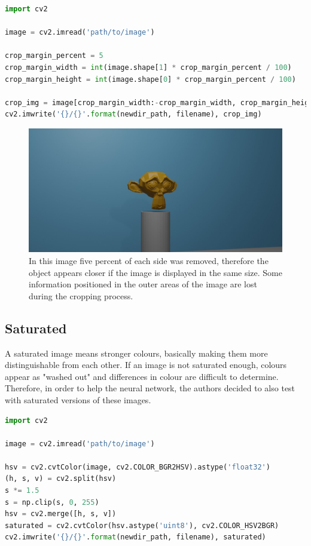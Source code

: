 \begin{lstlisting}[language=python]
import cv2

image = cv2.imread('path/to/image')

crop_margin_percent = 5
crop_margin_width = int(image.shape[1] * crop_margin_percent / 100)
crop_margin_height = int(image.shape[0] * crop_margin_percent / 100)

crop_img = image[crop_margin_width:-crop_margin_width, crop_margin_height:-crop_margin_height]
cv2.imwrite('{}/{}'.format(newdir_path, filename), crop_img)
\end{lstlisting}

\begin{figure}[h!]
	\centering
	\includegraphics[width=4.5in]{img/implementation_opencv_cropping.jpg}
	\caption{In this image five percent of each side was removed, therefore the object appears closer if the image is displayed in the same size. Some information positioned in the outer areas of the image are lost during the cropping process.}
	\label{pic:implementation_opencv_cropping}
\end{figure}

\subsection{Saturated}
A saturated image means stronger colours, basically making them more distinguishable from each other. If an image is not saturated enough, colours appear as "washed out" and differences in colour are difficult to determine. Therefore, in order to help the neural network, the authors decided to also test with saturated versions of these images.

\begin{lstlisting}[language=python]
import cv2

image = cv2.imread('path/to/image')

hsv = cv2.cvtColor(image, cv2.COLOR_BGR2HSV).astype('float32')
(h, s, v) = cv2.split(hsv)
s *= 1.5
s = np.clip(s, 0, 255)
hsv = cv2.merge([h, s, v])
saturated = cv2.cvtColor(hsv.astype('uint8'), cv2.COLOR_HSV2BGR)
cv2.imwrite('{}/{}'.format(newdir_path, filename), saturated)
\end{lstlisting}

